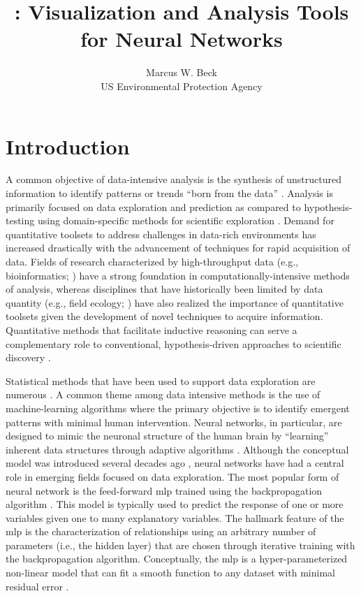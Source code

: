 \documentclass[article]{jss}
\author{Marcus W. Beck\\US Environmental Protection Agency}
\title{\pkg{NeuralNetTools}: Visualization and Analysis Tools for Neural Networks}
\begin{document}
\section[Introduction]{Introduction}

A common objective of data-intensive analysis is the synthesis of
unstructured information to identify patterns or trends ``born from the
data'' \citep{Bell09,Kelling09,Michener12}.  Analysis is primarily
focused on data exploration and prediction as compared to
hypothesis-testing using domain-specific methods for scientific
exploration \citep{Kell03}.  Demand for quantitative toolsets to
address challenges in data-rich environments has increased drastically
with the advancement of techniques for rapid acquisition of
data. Fields of research characterized by high-throughput data (e.g.,
bioinformatics; \citealt{Saeys07}) have a strong foundation in
computationally-intensive methods of analysis, whereas disciplines
that have historically been limited by data quantity (e.g., field
ecology; \citealt{Swanson15}) have also realized the importance of
quantitative toolsets given the development of novel techniques to
acquire information.  Quantitative methods that facilitate inductive
reasoning can serve a complementary role to conventional,
hypothesis-driven approaches to scientific discovery \citep{Kell03}.

Statistical methods that have been used to support data exploration
are numerous \citep{Jain00,Recknagel06,Zuur10}.  A common theme among
data intensive methods is the use of machine-learning algorithms where
the primary objective is to identify emergent patterns with minimal
human intervention.  Neural networks, in particular, are designed to
mimic the neuronal structure of the human brain by ``learning'' inherent
data structures through adaptive algorithms
\citep{Rumelhart86,Ripley96}.  Although the conceptual model was
introduced several decades ago \citep{McCulloch43}, neural networks
have had a central role in emerging fields focused on data
exploration.  The most popular form of neural network is the
feed-forward \ac{mlp} trained using the backpropagation algorithm
\citep{Rumelhart86}.  This model is typically used to predict the
response of one or more variables given one to many explanatory
variables.  The hallmark feature of the \ac{mlp} is the
characterization of relationships using an arbitrary number of
parameters (i.e., the hidden layer) that are chosen through iterative
training with the backpropagation algorithm.  Conceptually, the
\ac{mlp} is a hyper-parameterized non-linear model that can fit a
smooth function to any dataset with minimal residual error
\citep{Hornik91}.
\end{document}
